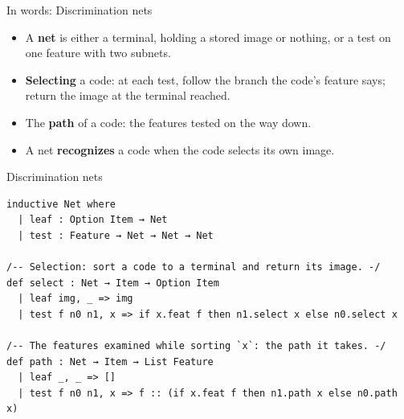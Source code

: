 \documentclass[aspectratio=169,11pt]{beamer}
\begin{document}
\begin{frame}{In words: Discrimination nets}
  \begin{itemize}
    \item A \textbf{net} is either a terminal, holding a stored image or nothing, or a test on one feature with two subnets.
    \item \textbf{Selecting} a code: at each test, follow the branch the code's feature says; return the image at the terminal reached.
    \item The \textbf{path} of a code: the features tested on the way down.
    \item A net \textbf{recognizes} a code when the code selects its own image.
  \end{itemize}
\end{frame}


\begin{frame}[fragile]{Discrimination nets}
\begin{Verbatim}
inductive Net where
  | leaf : Option Item → Net
  | test : Feature → Net → Net → Net

/-- Selection: sort a code to a terminal and return its image. -/
def select : Net → Item → Option Item
  | leaf img, _ => img
  | test f n0 n1, x => if x.feat f then n1.select x else n0.select x

/-- The features examined while sorting `x`: the path it takes. -/
def path : Net → Item → List Feature
  | leaf _, _ => []
  | test f n0 n1, x => f :: (if x.feat f then n1.path x else n0.path x)
\end{Verbatim}
\end{frame}
\end{document}
